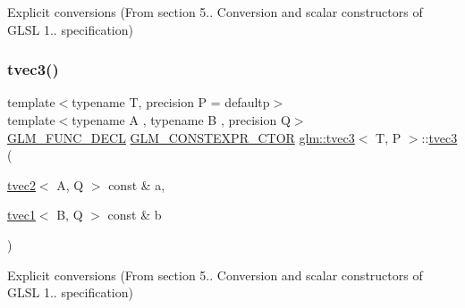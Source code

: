 Explicit conversions (From section 5.. Conversion and scalar constructors of G\+L\+SL 1.. specification) 

\mbox{\label{structglm_1_1tvec3_a06dbab521ff9e13874fcf9c2ccac832f}} 
\subsubsection{\texorpdfstring{tvec3()}{tvec3()}\hspace{0.1cm}{\footnotesize\ttfamily [10/23]}}
{\footnotesize\ttfamily template$<$typename T, precision P = defaultp$>$ \\
template$<$typename A , typename B , precision Q$>$ \\
\mbox{\hyperlink{setup_8hpp_ab2d052de21a70539923e9bcbf6e83a51}{G\+L\+M\+\_\+\+F\+U\+N\+C\+\_\+\+D\+E\+CL}} \mbox{\hyperlink{setup_8hpp_ad34178a09666081abdb573c14d1f4a5a}{G\+L\+M\+\_\+\+C\+O\+N\+S\+T\+E\+X\+P\+R\+\_\+\+C\+T\+OR}} \mbox{\hyperlink{structglm_1_1tvec3}{glm\+::tvec3}}$<$ T, P $>$\+::\mbox{\hyperlink{structglm_1_1tvec3}{tvec3}} (\begin{DoxyParamCaption}\item[{\mbox{\hyperlink{structglm_1_1tvec2}{tvec2}}$<$ A, Q $>$ const \&}]{a,  }\item[{\mbox{\hyperlink{structglm_1_1tvec1}{tvec1}}$<$ B, Q $>$ const \&}]{b }\end{DoxyParamCaption})}



Explicit conversions (From section 5.. Conversion and scalar constructors of G\+L\+SL 1.. specification) 

\mbox{\label{structglm_1_1tvec3_ac78c68860f00256ff44c73e7917d70f5}} 
